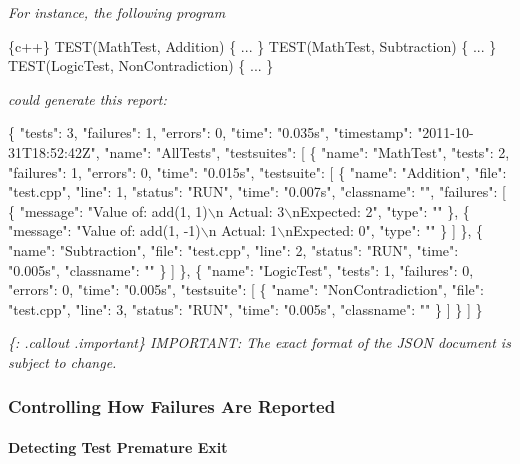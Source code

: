 {\itshape For instance, the following program}

{\itshape 
\begin{DoxyCode}
\{c++\}
TEST(MathTest, Addition) \{ ... \}
TEST(MathTest, Subtraction) \{ ... \}
TEST(LogicTest, NonContradiction) \{ ... \}
\end{DoxyCode}
}

{\itshape could generate this report\+:}

{\itshape 
\begin{DoxyCode}
\{
  "tests": 3,
  "failures": 1,
  "errors": 0,
  "time": "0.035s",
  "timestamp": "2011-10-31T18:52:42Z",
  "name": "AllTests",
  "testsuites": [
    \{
      "name": "MathTest",
      "tests": 2,
      "failures": 1,
      "errors": 0,
      "time": "0.015s",
      "testsuite": [
        \{
          "name": "Addition",
          "file": "test.cpp",
          "line": 1,
          "status": "RUN",
          "time": "0.007s",
          "classname": "",
          "failures": [
            \{
              "message": "Value of: add(1, 1)\(\backslash\)n  Actual: 3\(\backslash\)nExpected: 2",
              "type": ""
            \},
            \{
              "message": "Value of: add(1, -1)\(\backslash\)n  Actual: 1\(\backslash\)nExpected: 0",
              "type": ""
            \}
          ]
        \},
        \{
          "name": "Subtraction",
          "file": "test.cpp",
          "line": 2,
          "status": "RUN",
          "time": "0.005s",
          "classname": ""
        \}
      ]
    \},
    \{
      "name": "LogicTest",
      "tests": 1,
      "failures": 0,
      "errors": 0,
      "time": "0.005s",
      "testsuite": [
        \{
          "name": "NonContradiction",
          "file": "test.cpp",
          "line": 3,
          "status": "RUN",
          "time": "0.005s",
          "classname": ""
        \}
      ]
    \}
  ]
\}
\end{DoxyCode}
}

{\itshape \{\+: .callout .important\} I\+M\+P\+O\+R\+T\+A\+NT\+: The exact format of the J\+S\+ON document is subject to change.}

{\itshape \subsubsection*{Controlling How Failures Are Reported}}

{\itshape }

{\itshape \paragraph*{Detecting Test Premature Exit}}

